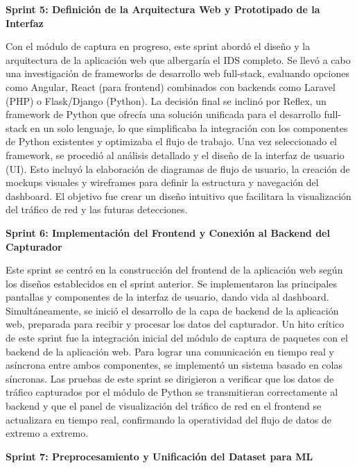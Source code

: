 \textbf{Sprint 5: Definición de la Arquitectura Web y Prototipado de la Interfaz}

Con el módulo de captura en progreso, este sprint abordó el diseño y la arquitectura de la aplicación web que albergaría el IDS completo. Se llevó a cabo una investigación de frameworks de desarrollo web full-stack, evaluando opciones como Angular, React (para frontend) combinados con backends como Laravel (PHP) o Flask/Django (Python). La decisión final se inclinó por Reflex, un framework de Python que ofrecía una solución unificada para el desarrollo full-stack en un solo lenguaje, lo que simplificaba la integración con los componentes de Python existentes y optimizaba el flujo de trabajo. Una vez seleccionado el framework, se procedió al análisis detallado y el diseño de la interfaz de usuario (UI). Esto incluyó la elaboración de diagramas de flujo de usuario, la creación de mockups visuales y wireframes para definir la estructura y navegación del dashboard. El objetivo fue crear un diseño intuitivo que facilitara la visualización del tráfico de red y las futuras detecciones.

\textbf{Sprint 6: Implementación del Frontend y Conexión al Backend del Capturador}

Este sprint se centró en la construcción del frontend de la aplicación web según los diseños establecidos en el sprint anterior. Se implementaron las principales pantallas y componentes de la interfaz de usuario, dando vida al dashboard. Simultáneamente, se inició el desarrollo de la capa de backend de la aplicación web, preparada para recibir y procesar los datos del capturador. Un hito crítico de este sprint fue la integración inicial del módulo de captura de paquetes con el backend de la aplicación web. Para lograr una comunicación en tiempo real y asíncrona entre ambos componentes, se implementó un sistema basado en colas síncronas. Las pruebas de este sprint se dirigieron a verificar que los datos de tráfico capturados por el módulo de Python se transmitieran correctamente al backend y que el panel de visualización del tráfico de red en el frontend se actualizara en tiempo real, confirmando la operatividad del flujo de datos de extremo a extremo.

\textbf{Sprint 7: Preprocesamiento y Unificación del Dataset para ML}

